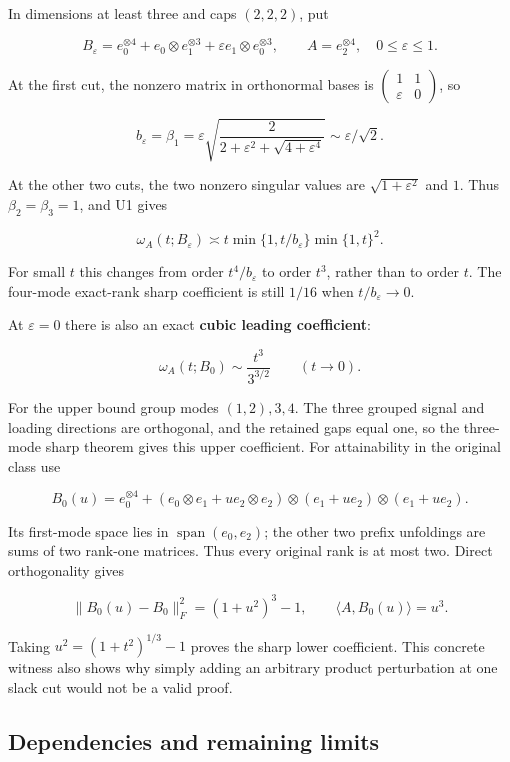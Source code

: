 \documentclass[
  11pt,
]{article}
\begin{document}
In dimensions at least three and caps \((2,2,2)\), put

\[B_\varepsilon=e_0^{\otimes4}
+e_0\otimes e_1^{\otimes3}
+\varepsilon e_1\otimes e_0^{\otimes3},\qquad
A=e_2^{\otimes4},\quad 0\le\varepsilon\le1.\]

At the first cut, the nonzero matrix in orthonormal bases is
\(\left(\begin{smallmatrix}1&1\\\varepsilon&0\end{smallmatrix}\right)\),
so

\[b_\varepsilon=\beta_1
=\varepsilon\sqrt{\frac{2}{2+\varepsilon^2+\sqrt{4+\varepsilon^4}}}
\sim\varepsilon/\sqrt2.\]

At the other two cuts, the two nonzero singular values are
\(\sqrt{1+\varepsilon^2}\) and \(1\). Thus \(\beta_2=\beta_3=1\), and U1
gives

\[\omega_A(t;B_\varepsilon)\asymp
t\min\{1,t/b_\varepsilon\}\min\{1,t\}^2.\tag{U3}\]

For small \(t\) this changes from order \(t^4/b_\varepsilon\) to order
\(t^3\), rather than to order \(t\). The four-mode exact-rank sharp
coefficient is still \(1/16\) when \(t/b_\varepsilon\to0\).

At \(\varepsilon=0\) there is also an exact \textbf{cubic leading
coefficient}:

\[\omega_A(t;B_0)\sim\frac{t^3}{3^{3/2}}\qquad(t\to0).\tag{U4}\]

For the upper bound group modes \((1,2),3,4\). The three grouped signal
and loading directions are orthogonal, and the retained gaps equal one,
so the three-mode sharp theorem gives this upper coefficient. For
attainability in the original class use

\[B_0(u)=e_0^{\otimes4}
+(e_0\otimes e_1+u e_2\otimes e_2)
\otimes(e_1+u e_2)\otimes(e_1+u e_2).\]

Its first-mode space lies in \(\operatorname{span}(e_0,e_2)\); the other
two prefix unfoldings are sums of two rank-one matrices. Thus every
original rank is at most two. Direct orthogonality gives

\[\|B_0(u)-B_0\|_F^2=(1+u^2)^3-1,\qquad
\langle A,B_0(u)\rangle=u^3.\]

Taking \(u^2=(1+t^2)^{1/3}-1\) proves the sharp lower coefficient. This
concrete witness also shows why simply adding an arbitrary product
perturbation at one slack cut would not be a valid proof.

\subsection{Dependencies and remaining
limits}\label{dependencies-and-remaining-limits}
\end{document}
